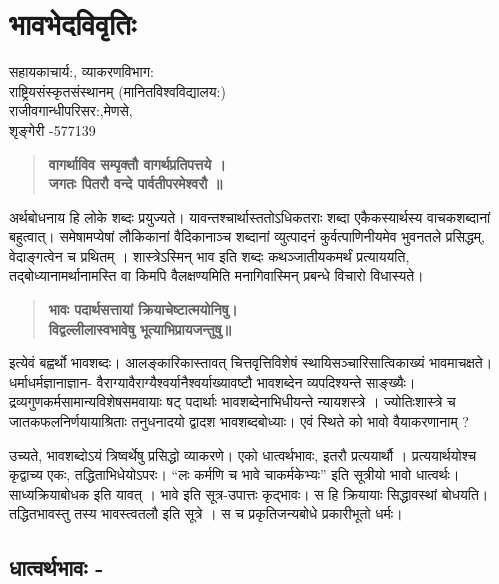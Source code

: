 {\fontsize{15}{17}\selectfont
\chapter{भावभेदविवृतिः}

\begin{center}
\smallskip

सहायकाचार्य:, व्याकरणविभाग:\\
राष्ट्रियसंस्कृतसंस्थानम् (मानितविश्वविद्यालय:)\\
राजीवगान्धीपरिसर:,मेणसे,\\ 
शृङ्गेरी -577139
\addrule
\end{center}

\begin{verse}
\textbf{वागर्थाविव सम्पृक्तौ वागर्थप्रतिपत्तये ।}\\
\textbf{जगतः पितरौ वन्दे पार्वतीपरमेश्वरौ ॥}
\end{verse}
अर्थबोधनाय हि लोके शब्दः प्रयुज्यते। यावन्तश्चार्थास्ततोऽधिकतराः शब्दा एकैकस्यार्थस्य वाचकशब्दानां बहुत्वात्। समेषामप्येषां लौकिकानां वैदिकानाञ्च शब्दानां व्युत्पादनं कुर्वत्पाणिनीयमेव भुवनतले प्रसिद्धम्, वेदाङ्गत्वेन च प्रथितम् । शास्त्रेऽस्मिन् भाव इति शब्दः कथञ्जातीयकमर्थं प्रत्याययति, तद्बोध्यानामर्थानामस्ति वा किमपि वैलक्षण्यमिति मनागिवास्मिन् प्रबन्धे विचारो विधास्यते।
\begin{verse}
\textbf{भावः पदार्थसत्तायां क्रियाचेष्टात्मयोनिषु।}\\
\textbf{विद्वल्लीलास्वभावेषु भूत्याभिप्रायजन्तुषु॥}
\end{verse}
इत्येवं बह्वर्थो भावशब्दः। आलङ्कारिकास्तावत् चित्तवृत्तिविशेषं स्थायिसञ्चारिसात्विकाख्यं भावमाचक्षते। धर्माधर्मज्ञानाज्ञान- वैराग्यावैराग्यैश्वर्यानैश्वर्याख्यावष्टौ भावशब्देन  व्यपदिश्यन्ते  साङ्ख्यैः। द्रव्यगुणकर्मसामान्यविशेषसमवायाः षट् पदार्थाः भावशब्देनाभिधीयन्ते न्यायशस्त्रे । ज्योतिःशास्त्रे च जातकफलनिर्णयायाश्रिताः तनुधनादयो द्वादश भावशब्दबोध्याः। एवं स्थिते को भावो वैयाकरणानाम् ?

उच्यते, भावशब्दोऽयं त्रिष्वर्थेषु प्रसिद्धो व्याकरणे। एको धात्वर्थभावः, इतरौ प्रत्ययार्थौ । प्रत्ययार्थयोश्च कृद्वाच्य एकः, तद्धिताभिधेयोऽपरः। “लः कर्मणि च भावे चाकर्मकेभ्यः” इति सूत्रीयो भावो धात्वर्थः। साध्यक्रियाबोधक इति यावत् । भावे इति सूत्र-उपात्तः कृद्भावः। स हि क्रियायाः सिद्धावस्थां बोधयति। तद्धितभावस्तु तस्य भावस्त्वतलौ इति सूत्रे । स च प्रकृतिजन्यबोधे प्रकारीभूतो धर्मः।

\section*{धात्वर्थभावः -} 

}

